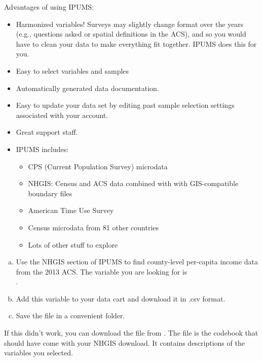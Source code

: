 \documentclass{beamer}
\begin{document}
\begin{frame}[allowframebreaks]
	Advantages of using IPUMS:
	\begin{itemize}
	    \item 
	    Harmonized variables! Surveys may slightly change format over the years (e.g., questions asked or spatial definitions in the ACS), and so you would have to clean your data to make everything fit together. IPUMS does this for you.
	    \item 
	    Easy to select variables and samples
	    \item
	    Automatically generated data documentation.
    	\item 
    	Easy to update your data set by editing past sample selection settings associated with your account.
    	\item
    	Great support staff.
    	\item
    	IPUMS includes:
    	\begin{itemize}
    	    \item
    	    CPS (Current Population Survey) microdata
    	    \item
    	    NHGIS: Census and ACS data combined with with GIS-compatible boundary files
    	    \item
    	    American Time Use Survey
    	    \item
    	    Census microdata from 81 other countries
    	    \item
    	    Lots of other stuff to explore
    	\end{itemize}
	\end{itemize}
	
	\vskip5cm
	
	\begin{myexc}
	\fontsize{10pt}{12}\selectfont
        \begin{enumerate}[(a)]
	        \item
	        Use the NHGIS section of IPUMS to find county-level per-capita income data from the 2013 ACS. The variable you are looking for is\\
	        .
	        \item
	        Add this variable to your data cart and download it in .csv format.
	        \item
	        Save the file in a convenient folder.
        \end{enumerate}
    If this didn't work, you can download the file  from \href{https://sites.google.com/site/reu2017vandijk/data}{}. The file  is the codebook that should have come with your NHGIS download. It contains descriptions of the variables you selected.
	\addtocounter{exccounter}{1}
	\end{myexc}
	
\end{frame}
\end{document}
